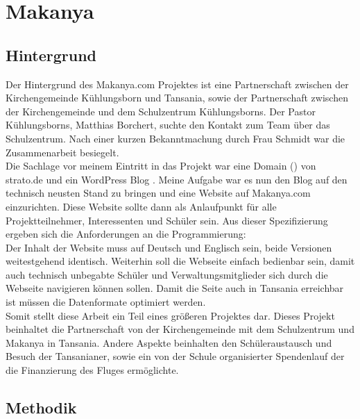 \section{Makanya}

\subsection{Hintergrund} %
Der Hintergrund des Makanya.com Projektes ist eine Partnerschaft zwischen der Kirchengemeinde Kühlungsborn und Tansania,
sowie der Partnerschaft zwischen der Kirchengemeinde und dem Schulzentrum Kühlungsborns.
Der Pastor Kühlungsborns, Matthias Borchert,
suchte den Kontakt zum \jf Team über das Schulzentrum.
Nach einer kurzen Bekanntmachung durch Frau Schmidt war die Zusammenarbeit besiegelt.\\
Die Sachlage vor meinem Eintritt in das Projekt war eine Domain () von strato.de %
und ein WordPress Blog .
Meine Aufgabe war es nun den Blog auf den technisch neusten Stand zu bringen und eine Website auf Makanya.com einzurichten.
Diese Website sollte dann als Anlaufpunkt für alle Projektteilnehmer, Interessenten und Schüler sein.
Aus dieser Spezifizierung ergeben sich die Anforderungen an die Programmierung:\\
Der Inhalt der Website muss auf Deutsch und Englisch sein, beide Versionen weitestgehend identisch.
Weiterhin soll die Webseite einfach bedienbar sein,
damit auch technisch unbegabte Schüler und Verwaltungsmitglieder sich durch die Webseite navigieren können sollen.
Damit die Seite auch in Tansania erreichbar ist müssen die Datenformate optimiert werden.\\
Somit stellt diese Arbeit ein Teil eines größeren Projektes dar.
Dieses Projekt beinhaltet die Partnerschaft von der Kirchengemeinde mit dem Schulzentrum und Makanya in Tansania.
Andere Aspekte beinhalten den Schüleraustausch und Besuch der Tansanianer,
sowie ein von der Schule organisierter Spendenlauf der die Finanzierung des Fluges ermöglichte.

\subsection{Methodik} %

